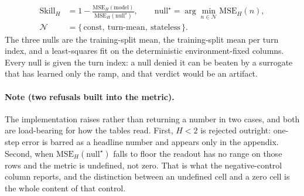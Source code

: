 \begin{align}
  \mathrm{Skill}_H &= 1 - \frac{\mathrm{MSE}_H(\text{model})}{\mathrm{MSE}_H(\text{null}^{\star})},
  \qquad
  \text{null}^{\star} = \arg\min_{n \in \mathcal{N}} \mathrm{MSE}_H(n),
  \label{eq:skill}\\[4pt]
  \mathcal{N} &= \bigl\{\, \text{const},\ \text{turn-mean},\ \text{stateless}\,\bigr\}.
  \label{eq:nulls}
\end{align}
%
\noindent The three nulls are the training-split mean, the training-split mean per turn index,
and a least-squares fit on the deterministic environment-fixed columns. Every null is given the
turn index: a null denied it can be beaten by a surrogate that has learned only the ramp, and
that verdict would be an artifact.

\paragraph{Note (two refusals built into the metric).}
The implementation raises rather than returning a number in two cases, and both are load-bearing
for how the tables read. First, $H < 2$ is rejected outright: one-step error is barred as a
headline number and appears only in the appendix. Second, when
$\mathrm{MSE}_H(\text{null}^{\star})$ falls to floor the readout has no range on those rows and
the metric is undefined, not zero. That is what the negative-control column reports, and the
distinction between an undefined cell and a zero cell is the whole content of that control.

